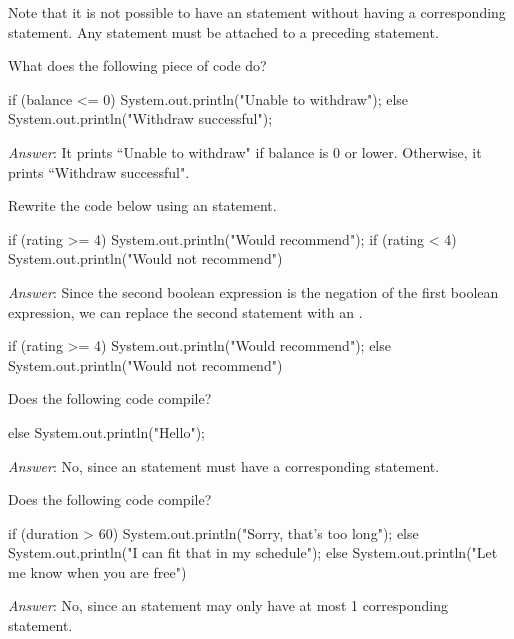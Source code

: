 Note that it is not possible to have an  statement without having a corresponding  statement. Any  statement must be attached to a preceding  statement. 

\begin{example}
What does the following piece of code do?

\begin{code}
if (balance <= 0) {
    System.out.println("Unable to withdraw");
} else {
    System.out.println("Withdraw successful");
}
\end{code}

\emph{Answer}: It prints ``Unable to withdraw" if balance is 0 or lower. Otherwise, it prints ``Withdraw successful".
\end{example}

\begin{example}
Rewrite the code below using an  statement.

\begin{code}
if (rating >= 4) {
    System.out.println("Would recommend");
} if (rating < 4) {
    System.out.println("Would not recommend")
}
\end{code}

\emph{Answer}: Since the second boolean expression is the negation of the first boolean expression, we can replace the second  statement with an .
\begin{code}
if (rating >= 4) {
    System.out.println("Would recommend");
} else {
    System.out.println("Would not recommend")
}
\end{code}
\end{example}

\begin{example}
Does the following code compile?

\begin{code}
else {
    System.out.println("Hello");
}
\end{code}

\emph{Answer}: No, since an  statement must have a corresponding  statement.
\end{example}

\begin{example}
Does the following code compile?

\begin{code}
if (duration > 60) {
    System.out.println("Sorry, that's too long");
} else {
    System.out.println("I can fit that in my schedule");
} else {
    System.out.println("Let me know when you are free")
}
\end{code}

\emph{Answer}: No, since an  statement may only have at most 1 corresponding  statement.
\end{example}

